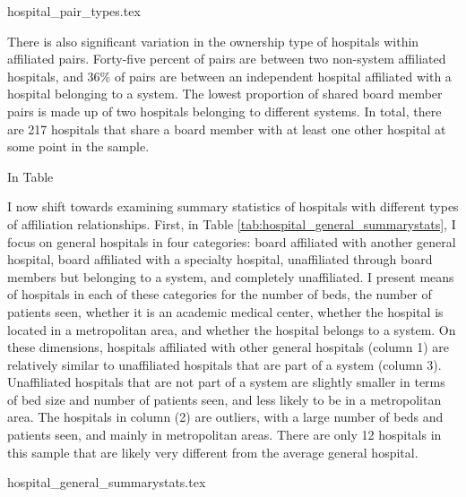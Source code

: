 \documentclass[12pt]{article}
\begin{document}
    {hospital_pair_types.tex}
    
    There is also significant variation in the ownership type of hospitals within affiliated pairs. Forty-five percent of pairs are between two non-system affiliated hospitals, and 36\% of pairs are between an independent hospital affiliated with a hospital belonging to a system. The lowest proportion of shared board member pairs is made up of two hospitals belonging to different systems. In total, there are 217 hospitals that share a board member with at least one other hospital at some point in the sample. 

    In Table 


    I now shift towards examining summary statistics of hospitals with different types of affiliation relationships. First, in Table \ref{tab:hospital_general_summarystats}, I focus on general hospitals in four categories: board affiliated with another general hospital, board affiliated with a specialty hospital, unaffiliated through board members but belonging to a system, and completely unaffiliated. I present means of hospitals in each of these categories for the number of beds, the number of patients seen, whether it is an academic medical center, whether the hospital is located in a metropolitan area, and whether the hospital belongs to a system. On these dimensions, hospitals affiliated with other general hospitals (column 1) are relatively similar to unaffiliated hospitals that are part of a system (column 3). Unaffiliated hospitals that are not part of a system are slightly smaller in terms of bed size and number of patients seen, and less likely to be in a metropolitan area. The hospitals in column (2) are outliers, with a large number of beds and patients seen, and mainly in metropolitan areas. There are only 12 hospitals in this sample that are likely very different from the average general hospital. 

    {hospital_general_summarystats.tex}
\end{document}
